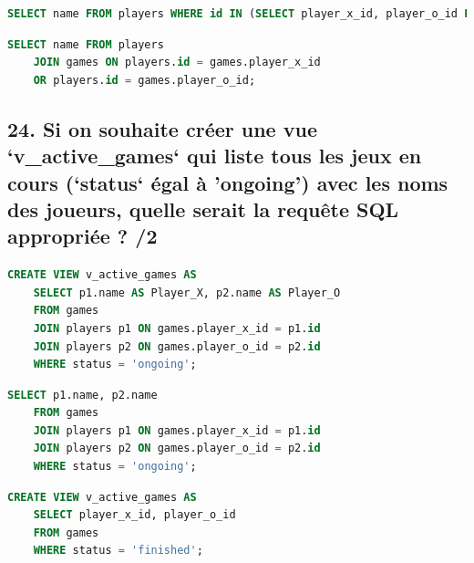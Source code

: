 \documentclass[12pt,a4paper]{article}
\begin{document}
\begin{flushleft}
\begin{choices}
    \item \hspace{1cm}
    \begin{lstlisting}[language=SQL]
    SELECT name FROM players WHERE id IN (SELECT player_x_id, player_o_id FROM games);
    \end{lstlisting}

    \item \hspace{1cm}
    \begin{lstlisting}[language=SQL]
    SELECT name FROM players
    JOIN games ON players.id = games.player_x_id
    OR players.id = games.player_o_id;
    \end{lstlisting}
\end{choices}

\newpage
\subsection*{24. Si on souhaite créer une vue `v\_active\_games` qui liste tous les jeux en cours (`status` égal à 'ongoing') avec les noms des joueurs, quelle serait la requête SQL appropriée ? /2}
\begin{choices}
    \item \hspace{1cm}
    \begin{lstlisting}[language=SQL]
    CREATE VIEW v_active_games AS
    SELECT p1.name AS Player_X, p2.name AS Player_O
    FROM games
    JOIN players p1 ON games.player_x_id = p1.id
    JOIN players p2 ON games.player_o_id = p2.id
    WHERE status = 'ongoing';
    \end{lstlisting}

    \item  \hspace{1cm}
    \begin{lstlisting}[language=SQL]
    SELECT p1.name, p2.name
    FROM games
    JOIN players p1 ON games.player_x_id = p1.id
    JOIN players p2 ON games.player_o_id = p2.id
    WHERE status = 'ongoing';
    \end{lstlisting}

    \item  \hspace{1cm}
    \begin{lstlisting}[language=SQL]
    CREATE VIEW v_active_games AS
    SELECT player_x_id, player_o_id
    FROM games
    WHERE status = 'finished';
    \end{lstlisting}


\end{choices}
\end{flushleft}
\end{document}
